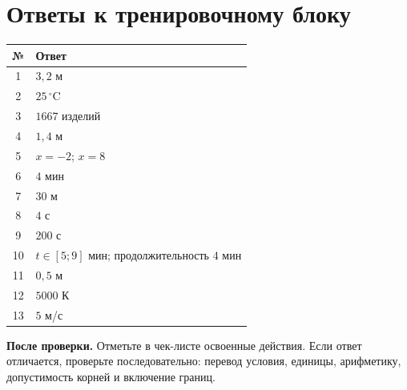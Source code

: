 \documentclass[a4paper,12pt]{article}
\newcommand{\heading}[1]{\section*{\color{darkaccent}#1}}
\begin{document}
\clearpage
\heading{Ответы к тренировочному блоку}
\begin{center}
\begin{tabularx}{\linewidth}{@{}cX@{}}
\toprule
№ & Ответ \\
\midrule
1 & $3,2$ м \\
2 & $25\,{}^{\circ}\text{C}$ \\
3 & $1667$ изделий \\
4 & $1,4$ м \\
5 & $x=-2$; $x=8$ \\
6 & $4$ мин \\
7 & $30$ м \\
8 & $4$ с \\
9 & $200$ с \\
10 & $t\in[5;9]$ мин; продолжительность $4$ мин \\
11 & $0,5$ м \\
12 & $5000$ К \\
13 & $5$ м/с \\
\bottomrule
\end{tabularx}
\end{center}
\vspace{7mm}
\textbf{После проверки.} Отметьте в чек-листе освоенные действия. Если ответ отличается, проверьте последовательно: перевод условия, единицы, арифметику, допустимость корней и включение границ.
\end{document}

